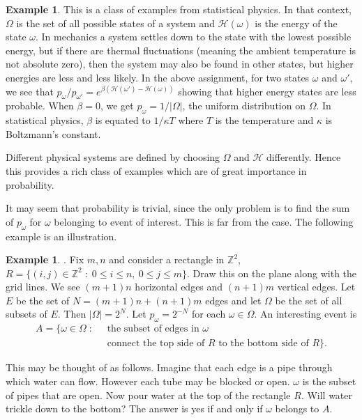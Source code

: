 \documentclass[preprint,  11pt]{amsart}
\newcommand{\parag}[1]{\vspace{4mm}\noindent{\bfseries #1}}
\theoremstyle{plain} %
\theoremstyle{definition} %
\newtheorem{example}[theorem]{Example}
\begin{document}
{\begin{example}
This is a class of examples from statistical physics. In that context, $\Omega$ is the set of all possible states of a system and ${\mathcal H}(\omega)$ is the energy of the state $\omega$. In mechanics a system settles down to the state with the lowest possible energy, but if there are thermal fluctuations (meaning the ambient temperature is not absolute zero), then the system may also be found in other states, but higher energies are less and less likely. In the above assignment, for two states $\omega$ and $\omega'$, we see that $p_{\omega}/p_{\omega'}=e^{\beta ({\mathcal H}(\omega')-{\mathcal H}(\omega))}$ showing that higher energy states are less probable. When $\beta=0$, we get $p_{\omega}=1/|\Omega|$, the uniform distribution on $\Omega$. In statistical physics, $\beta$ is equated to $1/\kappa T$ where $T$ is the temperature and $\kappa$ is Boltzmann's constant.

Different physical systems are defined by choosing $\Omega$ and ${\mathcal H}$ differently. Hence this provides a rich class of examples which are of great importance in probability.
\end{example}

It may seem that probability is trivial, since the only problem is to find the sum of $p_{\omega}$ for $\omega$ belonging to event of interest. This is far from the case. The following example is an illustration.

\begin{example}\parag{Percolation}. Fix $m,n$ and consider a rectangle in $\mathbb{Z}^{2}$, $R=\{(i,j)\in \mathbb{Z}^{2}{\; : \;} 0\le i\le n, \ 0\le j\le m\}$. Draw this on the plane along with the grid lines. We see $(m+1)n$ horizontal edges and $(n+1)m$ vertical edges. Let $E$ be the set of $N=(m+1)n+(n+1)m$ edges and let $\Omega$ be the set of all subsets of $E$. Then $|\Omega|=2^{N}$. Let $p_{\omega}=2^{-N}$ for each $\omega \in \Omega$. An interesting event is
\begin{align*}
A=\{\omega \in \Omega{\; : \;} & \mbox{ the subset of edges in }\omega \\
 & \mbox{ connect  the top side of }R \mbox{ to the bottom side of }R\}.
\end{align*}

This may be thought of as follows. Imagine that each edge is a pipe through which water can flow. However each tube may be blocked or open. $\omega$ is the subset of pipes that are open. Now pour water at the top of the rectangle $R$. Will water trickle down to the bottom? The answer is yes if and only if $\omega$ belongs to $A$.


\end{example}}
\end{document}
